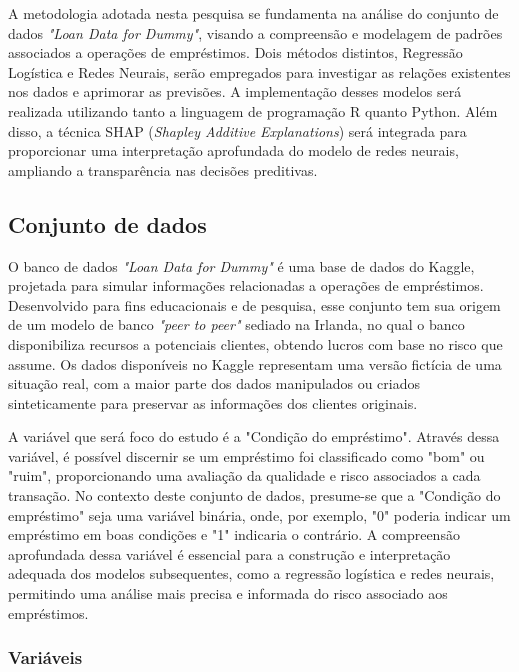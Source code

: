A metodologia adotada nesta pesquisa se fundamenta na análise do conjunto de dados \textit{"Loan Data for Dummy"}, 
visando a compreensão e modelagem de padrões associados a operações de empréstimos. Dois métodos distintos, 
Regressão Logística e Redes Neurais, serão empregados para investigar as relações existentes nos dados e aprimorar as previsões.
A implementação desses modelos será realizada utilizando tanto a linguagem de programação R quanto Python.
Além disso, a técnica SHAP (\textit{Shapley Additive Explanations}) será integrada para proporcionar
uma interpretação aprofundada do modelo de redes neurais, ampliando a transparência nas decisões preditivas. 



\subsection{Conjunto de dados}

O banco de dados \textit{"Loan Data for Dummy"} é uma base de dados do Kaggle, projetada para simular informações relacionadas 
a operações de empréstimos. Desenvolvido para fins educacionais e de pesquisa, esse conjunto tem sua origem de um modelo de 
banco \textit{"peer to peer"} sediado na Irlanda, no qual o banco disponibiliza recursos a potenciais clientes, 
obtendo lucros com base no risco que assume. 
Os dados disponíveis no Kaggle representam uma versão fictícia de uma situação real, com a maior parte dos dados manipulados
ou criados sinteticamente para preservar as informações dos clientes originais.

A variável que será foco do estudo é a "Condição do empréstimo". Através dessa variável, é 
possível discernir se um empréstimo foi classificado como "bom" ou "ruim", proporcionando uma avaliação da qualidade e 
risco associados a cada transação. No contexto deste conjunto de dados, presume-se que a "Condição do empréstimo" seja uma variável binária,
onde, por exemplo, "0" poderia indicar um empréstimo em boas condições e "1" indicaria o contrário.
A compreensão aprofundada dessa variável é essencial para a construção e interpretação adequada dos modelos subsequentes, 
como a regressão logística e redes neurais, permitindo uma análise mais precisa e informada do risco associado aos empréstimos.

\subsubsection{Variáveis}

